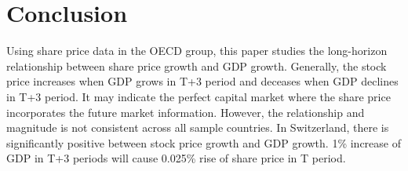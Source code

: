 \documentclass[../main.tex]{subfiles}
\begin{document}
\section{Conclusion}

Using share price data in the OECD group, this paper studies the long-horizon relationship between share price growth and GDP growth. Generally, the stock price increases when GDP grows in T+3 period and deceases when GDP declines in T+3 period. It may indicate the perfect capital market where the share price incorporates the future market information. However, the relationship and magnitude is not consistent across all sample countries. In Switzerland, there is significantly positive between stock price growth and GDP growth. 1\% increase of GDP in T+3 periods will cause 0.025\% rise of share price in T period.
\end{document}

